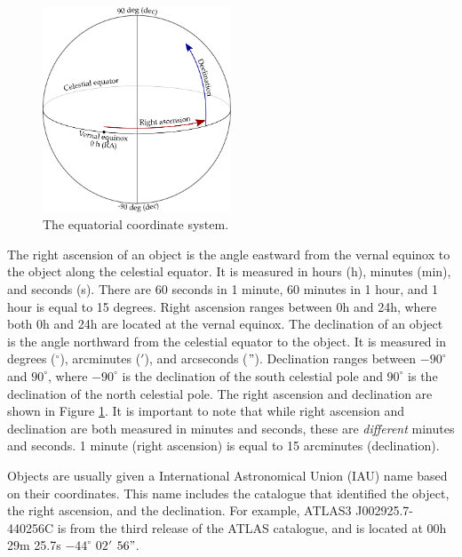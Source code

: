             \begin{figure}[!ht]
                \centering
                \includegraphics[width=0.5\textwidth]{images/ra-dec}
                \caption{The equatorial coordinate system.}
                \label{fig:equatorial-coordinates}
            \end{figure}

            The right ascension of an object is the angle eastward from the
            vernal equinox to the object along the celestial equator. It is
            measured in hours (h), minutes (min), and seconds (s). There are 60
            seconds in 1 minute, 60 minutes in 1 hour, and 1 hour is equal to 15
            degrees. Right ascension ranges between 0h and 24h, where both 0h
            and 24h are located at the vernal equinox. The declination of an
            object is the angle northward from the celestial equator to the
            object. It is measured in degrees (${}^\circ$), arcminutes ($'$),
            and arcseconds ($"$). Declination ranges between $-90^\circ$ and
            $90^\circ$, where $-90^\circ$ is the declination of the south
            celestial pole and $90^\circ$ is the declination of the north
            celestial pole. The right ascension and declination are shown in
            Figure \ref{fig:equatorial-coordinates}. It is important to note
            that while right ascension and declination are both measured in
            minutes and seconds, these are \emph{different} minutes and seconds.
            1 minute (right ascension) is equal to 15 arcminutes (declination).

            Objects are usually given a International Astronomical Union (IAU)
            name based on their coordinates. This name includes the catalogue
            that identified the object, the right ascension, and the
            declination. For example, ATLAS3 J002925.7-440256C is from the third
            release of the ATLAS catalogue, and is located at 00h 29m 25.7s
            $-44^\circ$ $02'$ $56"$.


